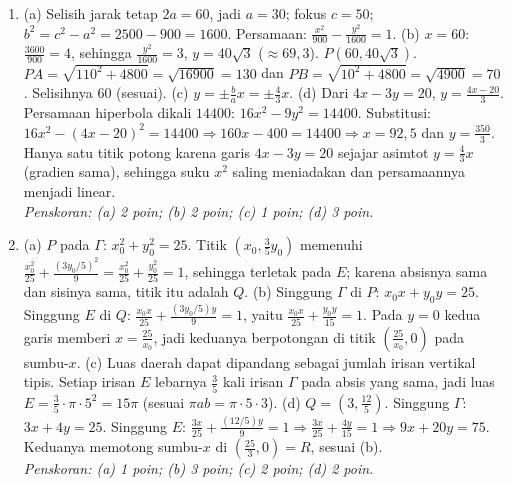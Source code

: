 \documentclass[a4paper,11pt]{article}
\begin{document}
\begin{enumerate}[leftmargin=2em,itemsep=3pt,topsep=2pt]
\item[\textbf{4.}] (a) Selisih jarak tetap $2a=60$, jadi $a=30$; fokus $c=50$; $b^2=c^2-a^2=2500-900=1600$. Persamaan: $\frac{x^2}{900}-\frac{y^2}{1600}=1$. (b) $x=60$: $\frac{3600}{900}=4$, sehingga $\frac{y^2}{1600}=3$, $y=40\sqrt3$ ($\approx69{,}3$). $P(60,40\sqrt3)$. $PA=\sqrt{110^2+4800}=\sqrt{16900}=130$ dan $PB=\sqrt{10^2+4800}=\sqrt{4900}=70$. Selisihnya $60$ (sesuai). (c) $y=\pm\frac bax=\pm\frac43x$. (d) Dari $4x-3y=20$, $y=\frac{4x-20}3$. Persamaan hiperbola dikali $14400$: $16x^2-9y^2=14400$. Substitusi: $16x^2-(4x-20)^2=14400\Rightarrow160x-400=14400\Rightarrow x=92{,}5$ dan $y=\frac{350}3$. Hanya satu titik potong karena garis $4x-3y=20$ sejajar asimtot $y=\frac43x$ (gradien sama), sehingga suku $x^2$ saling meniadakan dan persamaannya menjadi linear. \\ \textit{Penskoran: (a) 2 poin; (b) 2 poin; (c) 1 poin; (d) 3 poin.}
\item[\textbf{5.}] (a) $P$ pada $\Gamma$: $x_0^2+y_0^2=25$. Titik $\left(x_0,\frac35y_0\right)$ memenuhi $\frac{x_0^2}{25}+\frac{(3y_0/5)^2}{9}=\frac{x_0^2}{25}+\frac{y_0^2}{25}=1$, sehingga terletak pada $E$; karena absisnya sama dan sisinya sama, titik itu adalah $Q$. (b) Singgung $\Gamma$ di $P$: $x_0x+y_0y=25$. Singgung $E$ di $Q$: $\frac{x_0x}{25}+\frac{(3y_0/5)y}{9}=1$, yaitu $\frac{x_0x}{25}+\frac{y_0y}{15}=1$. Pada $y=0$ kedua garis memberi $x=\frac{25}{x_0}$, jadi keduanya berpotongan di titik $\left(\frac{25}{x_0},0\right)$ pada sumbu-$x$. (c) Luas daerah dapat dipandang sebagai jumlah irisan vertikal tipis. Setiap irisan $E$ lebarnya $\frac35$ kali irisan $\Gamma$ pada absis yang sama, jadi luas $E=\frac35\cdot\pi\cdot5^2=15\pi$ (sesuai $\pi ab=\pi\cdot5\cdot3$). (d) $Q=\left(3,\frac{12}5\right)$. Singgung $\Gamma$: $3x+4y=25$. Singgung $E$: $\frac{3x}{25}+\frac{(12/5)y}{9}=1\Rightarrow\frac{3x}{25}+\frac{4y}{15}=1\Rightarrow9x+20y=75$. Keduanya memotong sumbu-$x$ di $\left(\frac{25}3,0\right)=R$, sesuai (b). \\ \textit{Penskoran: (a) 1 poin; (b) 3 poin; (c) 2 poin; (d) 2 poin.}
\end{enumerate}
\end{document}

